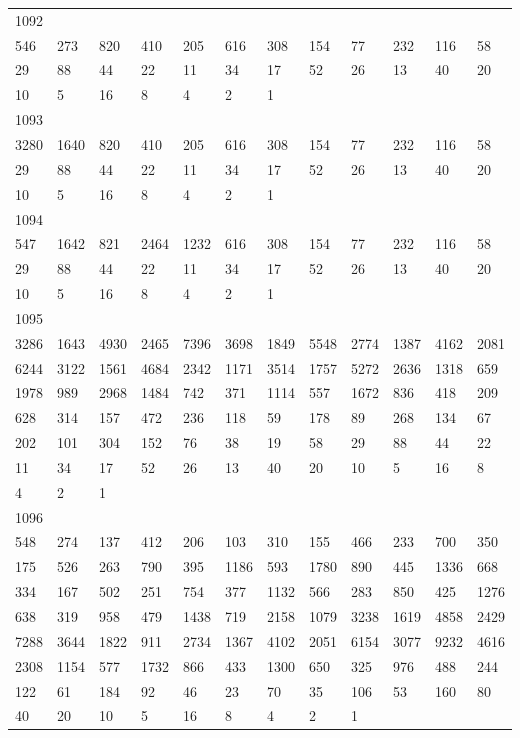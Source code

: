 \begin{longtable}{llllllllllll}
1092&&&&&&&&&&&\\
546& 273& 820& 410& 205& 616& 308& 154& 77& 232& 116& 58\\
29& 88& 44& 22& 11& 34& 17& 52& 26& 13& 40& 20\\
10& 5& 16& 8& 4& 2& 1& \\

1093&&&&&&&&&&&\\
3280& 1640& 820& 410& 205& 616& 308& 154& 77& 232& 116& 58\\
29& 88& 44& 22& 11& 34& 17& 52& 26& 13& 40& 20\\
10& 5& 16& 8& 4& 2& 1& \\

1094&&&&&&&&&&&\\
547& 1642& 821& 2464& 1232& 616& 308& 154& 77& 232& 116& 58\\
29& 88& 44& 22& 11& 34& 17& 52& 26& 13& 40& 20\\
10& 5& 16& 8& 4& 2& 1& \\

1095&&&&&&&&&&&\\
3286& 1643& 4930& 2465& 7396& 3698& 1849& 5548& 2774& 1387& 4162& 2081\\
6244& 3122& 1561& 4684& 2342& 1171& 3514& 1757& 5272& 2636& 1318& 659\\
1978& 989& 2968& 1484& 742& 371& 1114& 557& 1672& 836& 418& 209\\
628& 314& 157& 472& 236& 118& 59& 178& 89& 268& 134& 67\\
202& 101& 304& 152& 76& 38& 19& 58& 29& 88& 44& 22\\
11& 34& 17& 52& 26& 13& 40& 20& 10& 5& 16& 8\\
4& 2& 1& \\

1096&&&&&&&&&&&\\
548& 274& 137& 412& 206& 103& 310& 155& 466& 233& 700& 350\\
175& 526& 263& 790& 395& 1186& 593& 1780& 890& 445& 1336& 668\\
334& 167& 502& 251& 754& 377& 1132& 566& 283& 850& 425& 1276\\
638& 319& 958& 479& 1438& 719& 2158& 1079& 3238& 1619& 4858& 2429\\
7288& 3644& 1822& 911& 2734& 1367& 4102& 2051& 6154& 3077& 9232& 4616\\
2308& 1154& 577& 1732& 866& 433& 1300& 650& 325& 976& 488& 244\\
122& 61& 184& 92& 46& 23& 70& 35& 106& 53& 160& 80\\
40& 20& 10& 5& 16& 8& 4& 2& 1& \\


\end{longtable}
